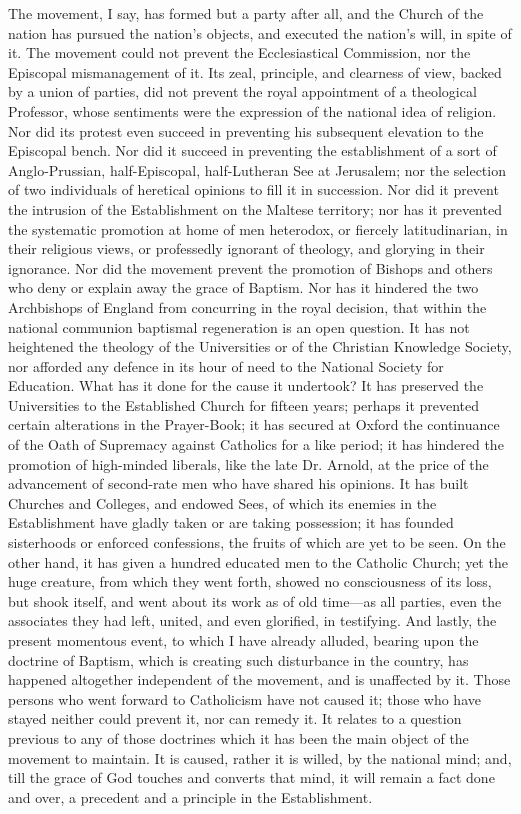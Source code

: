 The movement, I say, has formed but a party after all, and the
Church of the nation has pursued the nation's objects, and executed
the nation's will, in spite of it. The movement could not prevent the
Ecclesiastical Commission, nor the Episcopal mismanagement of it. Its
zeal, principle, and clearness of view, backed by a union of parties,
did not prevent the royal appointment of a theological Professor,
whose sentiments were the expression of the national idea of religion.
Nor did its protest even succeed in preventing his subsequent
elevation to the Episcopal bench. Nor did it succeed in preventing the
establishment of a sort of Anglo-Prussian, half-Episcopal,
half-Lutheran See at Jerusalem; nor the selection of two individuals
of heretical opinions to fill it in succession. Nor did it prevent the
intrusion of the Establishment on the Maltese territory; nor has it
prevented the systematic promotion at home of men heterodox, or
fiercely latitudinarian, in their religious views, or professedly
ignorant of theology, and glorying in their ignorance. Nor did the
movement prevent the promotion of Bishops and others who deny or
explain away the grace of Baptism. Nor has it hindered the two
Archbishops of England from concurring in the royal decision, that
within the national communion baptismal regeneration is an open
question. It has not heightened the theology of the Universities or of
the Christian Knowledge Society, nor afforded any defence in its hour
of need to the National Society for Education. What has it done for
the cause it undertook? It has preserved the Universities to the
Established Church for fifteen years; perhaps it prevented certain
alterations in the Prayer-Book; it has secured at Oxford the
continuance of the Oath of Supremacy against Catholics for a like
period; it has hindered the promotion of high-minded liberals, like
the late Dr. Arnold, at the price of the advancement of second-rate
men who have shared his opinions. It has built Churches and Colleges,
and endowed Sees, of which its enemies in the Establishment have
gladly taken or are taking possession; it has founded sisterhoods or
enforced confessions, the fruits of which are yet to be seen. On the
other hand, it has given a hundred educated men to the Catholic
Church; yet the huge creature, from which they went forth, showed no
consciousness of its loss, but shook itself, and went about its work
as of old time—as all parties, even the associates they had left,
united, and even glorified, in testifying. And lastly, the present
momentous event, to which I have already alluded, bearing upon the
doctrine of Baptism, which is creating such disturbance in the
country, has happened altogether independent of the movement, and is
unaffected by it. Those persons who went forward to Catholicism have
not caused it; those who have stayed neither could prevent it, nor can
remedy it. It relates to a question previous to any of those doctrines
which it has been the main object of the movement to maintain. It is
caused, rather it is willed, by the national mind; and, till the grace
of God touches and converts that mind, it will remain a fact done and
over, a precedent and a principle in the Establishment.

